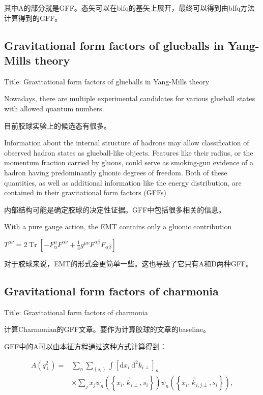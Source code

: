 \documentclass{article}
\begin{document}
其中A的部分就是GFF。态矢可以在blfq的基矢上展开，最终可以得到由blfq方法计算得到的GFF。


\subsection{Gravitational form factors of glueballs in Yang-Mills theory}

Title: Gravitational form factors of glueballs in Yang-Mills theory \cite{abbott2025gravitationalformfactorsglueballs}


Nowadays, there are multiple experimental candidates for various glueball states with allowed quantum numbers.

目前胶球实验上的候选态有很多。

Information about the internal structure of hadrons may allow classification of observed hadron states as glueball-like objects. Features like their radius, or the momentum fraction carried by gluons, could serve as smoking-gun evidence of a hadron having predominantly gluonic degrees of freedom. Both of these quantities, as well as additional information like the energy distribution, are contained in their gravitational form factors (GFFs)

内部结构可能是确定胶球的决定性证据。GFF中包括很多相关的信息。


With a pure gauge action, the EMT contains only a gluonic contribution 

$T^{\mu \nu}=2 \operatorname{Tr}\left[-F_\alpha^\mu F^{\alpha \nu}+\frac{1}{4} g^{\mu \nu} F^{\alpha \beta} F_{\alpha \beta}\right]$

对于胶球来说，EMT的形式会更简单一些。这也导致了它只有A和D两种GFF。



\subsection{Gravitational form factors of charmonia}

Title: Gravitational form factors of charmonia \cite{PhysRevD.109.114024}

计算Charmonian的GFF文章。要作为计算胶球的文章的baseline。

GFF中的A可以由本征方程通过这种方式计算得到：

\begin{equation}
    \begin{aligned}
    A\left(q_{\perp}^2\right)= & \sum_n \sum_{\left\{s_i\right\}} \int\left[\mathrm{d} x_i \mathrm{~d}^2 k_{i \perp}\right]_n \\
    & \times \sum_j x_j \psi_n\left(\left\{x_i, \vec{k}_{i \perp}, s_i\right\}\right) \psi_n\left(\left\{x_i, \vec{k}_{i, j \perp}, s_i\right\}\right),
    \end{aligned}
\end{equation}
\end{document}
